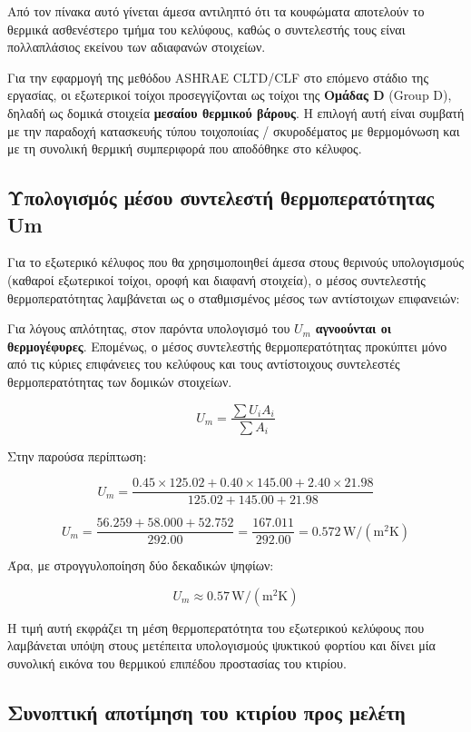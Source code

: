 \documentclass[12pt,a4paper]{article}
\begin{document}
Από τον πίνακα αυτό γίνεται άμεσα αντιληπτό ότι τα κουφώματα αποτελούν το θερμικά
ασθενέστερο τμήμα του κελύφους, καθώς ο συντελεστής τους είναι πολλαπλάσιος εκείνου
των αδιαφανών στοιχείων.

Για την εφαρμογή της μεθόδου \textenglish{ASHRAE CLTD/CLF} στο επόμενο στάδιο της
εργασίας, οι εξωτερικοί τοίχοι προσεγγίζονται ως τοίχοι της \textbf{Ομάδας D}
(\textenglish{Group D}), δηλαδή ως δομικά στοιχεία \textbf{μεσαίου θερμικού βάρους}.
Η επιλογή αυτή είναι συμβατή με την παραδοχή κατασκευής τύπου τοιχοποιίας / σκυροδέματος
με θερμομόνωση και με τη συνολική θερμική συμπεριφορά που αποδόθηκε στο κέλυφος.

\subsection{Υπολογισμός μέσου συντελεστή θερμοπερατότητας Um}

Για το εξωτερικό κέλυφος που θα χρησιμοποιηθεί άμεσα στους θερινούς υπολογισμούς
(καθαροί εξωτερικοί τοίχοι, οροφή και διαφανή στοιχεία), ο μέσος συντελεστής
θερμοπερατότητας λαμβάνεται ως ο σταθμισμένος μέσος των αντίστοιχων επιφανειών:

Για λόγους απλότητας, στον παρόντα υπολογισμό του \(U_m\) \textbf{αγνοούνται οι
θερμογέφυρες}. Επομένως, ο μέσος συντελεστής θερμοπερατότητας προκύπτει μόνο από
τις κύριες επιφάνειες του κελύφους και τους αντίστοιχους συντελεστές
θερμοπερατότητας των δομικών στοιχείων.

\[
U_m = \frac{\sum U_i A_i}{\sum A_i}
\]

Στην παρούσα περίπτωση:

\[
U_m =
\frac{
0.45 \times 125.02 +
0.40 \times 145.00 +
2.40 \times 21.98
}{
125.02 + 145.00 + 21.98
}
\]

\[
U_m =
\frac{56.259 + 58.000 + 52.752}{292.00}
=
\frac{167.011}{292.00}
=
0.572\,\mathrm{W/(m^2K)}
\]

Άρα, με στρογγυλοποίηση δύο δεκαδικών ψηφίων:

\[
\boxed{U_m \approx 0.57\,\mathrm{W/(m^2K)}}
\]

Η τιμή αυτή εκφράζει τη μέση θερμοπερατότητα του εξωτερικού κελύφους που λαμβάνεται
υπόψη στους μετέπειτα υπολογισμούς ψυκτικού φορτίου και δίνει μία συνολική εικόνα του
θερμικού επιπέδου προστασίας του κτιρίου.

\subsection{Συνοπτική αποτίμηση του κτιρίου προς μελέτη}
\end{document}
